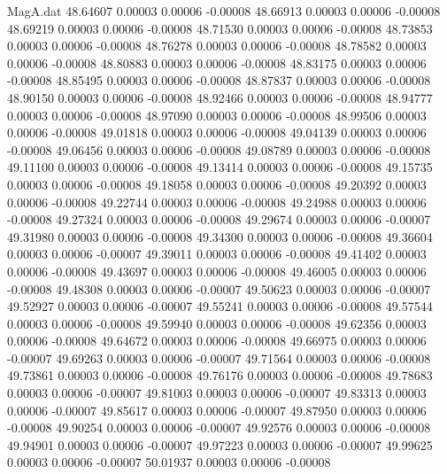 \begin{filecontents}{MagA.dat}
  48.64607    0.00003    0.00006   -0.00008
  48.66913    0.00003    0.00006   -0.00008
  48.69219    0.00003    0.00006   -0.00008
  48.71530    0.00003    0.00006   -0.00008
  48.73853    0.00003    0.00006   -0.00008
  48.76278    0.00003    0.00006   -0.00008
  48.78582    0.00003    0.00006   -0.00008
  48.80883    0.00003    0.00006   -0.00008
  48.83175    0.00003    0.00006   -0.00008
  48.85495    0.00003    0.00006   -0.00008
  48.87837    0.00003    0.00006   -0.00008
  48.90150    0.00003    0.00006   -0.00008
  48.92466    0.00003    0.00006   -0.00008
  48.94777    0.00003    0.00006   -0.00008
  48.97090    0.00003    0.00006   -0.00008
  48.99506    0.00003    0.00006   -0.00008
  49.01818    0.00003    0.00006   -0.00008
  49.04139    0.00003    0.00006   -0.00008
  49.06456    0.00003    0.00006   -0.00008
  49.08789    0.00003    0.00006   -0.00008
  49.11100    0.00003    0.00006   -0.00008
  49.13414    0.00003    0.00006   -0.00008
  49.15735    0.00003    0.00006   -0.00008
  49.18058    0.00003    0.00006   -0.00008
  49.20392    0.00003    0.00006   -0.00008
  49.22744    0.00003    0.00006   -0.00008
  49.24988    0.00003    0.00006   -0.00008
  49.27324    0.00003    0.00006   -0.00008
  49.29674    0.00003    0.00006   -0.00007
  49.31980    0.00003    0.00006   -0.00008
  49.34300    0.00003    0.00006   -0.00008
  49.36604    0.00003    0.00006   -0.00007
  49.39011    0.00003    0.00006   -0.00008
  49.41402    0.00003    0.00006   -0.00008
  49.43697    0.00003    0.00006   -0.00008
  49.46005    0.00003    0.00006   -0.00008
  49.48308    0.00003    0.00006   -0.00007
  49.50623    0.00003    0.00006   -0.00007
  49.52927    0.00003    0.00006   -0.00007
  49.55241    0.00003    0.00006   -0.00008
  49.57544    0.00003    0.00006   -0.00008
  49.59940    0.00003    0.00006   -0.00008
  49.62356    0.00003    0.00006   -0.00008
  49.64672    0.00003    0.00006   -0.00008
  49.66975    0.00003    0.00006   -0.00007
  49.69263    0.00003    0.00006   -0.00007
  49.71564    0.00003    0.00006   -0.00008
  49.73861    0.00003    0.00006   -0.00008
  49.76176    0.00003    0.00006   -0.00008
  49.78683    0.00003    0.00006   -0.00007
  49.81003    0.00003    0.00006   -0.00007
  49.83313    0.00003    0.00006   -0.00007
  49.85617    0.00003    0.00006   -0.00007
  49.87950    0.00003    0.00006   -0.00008
  49.90254    0.00003    0.00006   -0.00007
  49.92576    0.00003    0.00006   -0.00008
  49.94901    0.00003    0.00006   -0.00007
  49.97223    0.00003    0.00006   -0.00007
  49.99625    0.00003    0.00006   -0.00007
  50.01937    0.00003    0.00006   -0.00008

\end{filecontents}
